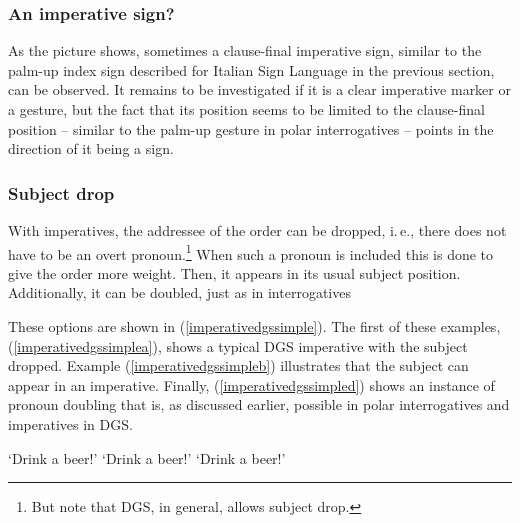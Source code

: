 \subsubsection{An imperative sign?}
As the picture shows, sometimes a clause-final imperative sign, similar to the palm-up index sign described for Italian Sign Language in the previous section, can be observed. It remains to be investigated if it is a clear imperative marker or a gesture, but the fact that its position seems to be limited to the clause-final position -- similar to the palm-up gesture in polar interrogatives -- points in the direction of it being a sign. 

\subsubsection{Subject drop}
With imperatives, the addressee of the order can be dropped, i.\,e., there does not have to be an overt pronoun.\footnote{ But note that DGS, in general, allows subject drop.} When such a pronoun is included this is done to give the order more weight. Then, it appears in its usual subject position. Additionally, it can be doubled, just as in interrogatives 

These options are shown in (\ref{imperativedgssimple}). The first of these examples, (\ref{imperativedgssimplea}), shows a typical DGS imperative with the subject dropped. Example (\ref{imperativedgssimpleb}) illustrates that the subject can appear in an imperative. Finally, (\ref{imperativedgssimpled}) shows an instance of pronoun doubling that is, as discussed earlier, possible in polar interrogatives and imperatives in DGS.

\begin{exe}
\ex\label{imperativedgssimple}\begin{xlist} 
\ex {}
%
\glt `Drink a beer!' \label{imperativedgssimplea}
\ex {}
%
\glt `Drink a beer!' \label{imperativedgssimpleb}
\ex {}
%
\glt `Drink a beer!' \label{imperativedgssimpled}
\end{xlist}
\end{exe}

